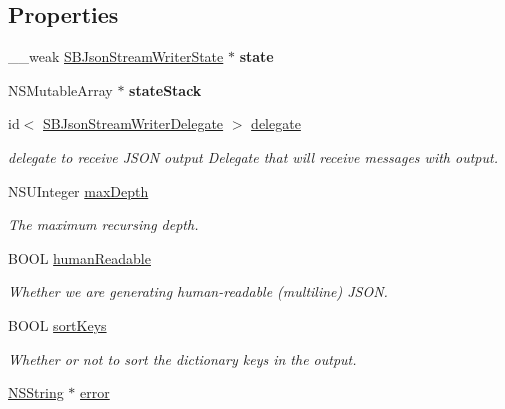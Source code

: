 \subsection*{\-Properties}
\begin{DoxyCompactItemize}
\item 
\hypertarget{interface_s_b_json_stream_writer_a39ceee8cac54429ab8851c1c7fab7360}{
\-\_\-\-\_\-weak \hyperlink{interface_s_b_json_stream_writer_state}{\-S\-B\-Json\-Stream\-Writer\-State} $\ast$ {\bfseries state}}
\label{interface_s_b_json_stream_writer_a39ceee8cac54429ab8851c1c7fab7360}

\item 
\hypertarget{interface_s_b_json_stream_writer_a8d85254a1e60703a2f8e3be4a6002495}{
\-N\-S\-Mutable\-Array $\ast$ {\bfseries state\-Stack}}
\label{interface_s_b_json_stream_writer_a8d85254a1e60703a2f8e3be4a6002495}

\item 
\hypertarget{interface_s_b_json_stream_writer_a7ab6ec363a52e32056130dbcefadd952}{
id$<$ \hyperlink{protocol_s_b_json_stream_writer_delegate-p}{\-S\-B\-Json\-Stream\-Writer\-Delegate} $>$ \hyperlink{interface_s_b_json_stream_writer_a7ab6ec363a52e32056130dbcefadd952}{delegate}}
\label{interface_s_b_json_stream_writer_a7ab6ec363a52e32056130dbcefadd952}

\begin{DoxyCompactList}\small\item\em delegate to receive \-J\-S\-O\-N output \-Delegate that will receive messages with output. \end{DoxyCompactList}\item 
\-N\-S\-U\-Integer \hyperlink{interface_s_b_json_stream_writer_a146e7e950ab74a0e766ffd860e454fc9}{max\-Depth}
\begin{DoxyCompactList}\small\item\em \-The maximum recursing depth. \end{DoxyCompactList}\item 
\-B\-O\-O\-L \hyperlink{interface_s_b_json_stream_writer_af43e8bd7170d6128480515f532b7b791}{human\-Readable}
\begin{DoxyCompactList}\small\item\em \-Whether we are generating human-\/readable (multiline) \-J\-S\-O\-N. \end{DoxyCompactList}\item 
\-B\-O\-O\-L \hyperlink{interface_s_b_json_stream_writer_ab206c6844a0fd20307b5dfe881e17bf2}{sort\-Keys}
\begin{DoxyCompactList}\small\item\em \-Whether or not to sort the dictionary keys in the output. \end{DoxyCompactList}\item 
\hypertarget{interface_s_b_json_stream_writer_af9ad1ac60aaa480f4b4543e42e40fcf2}{
\hyperlink{class_n_s_string}{\-N\-S\-String} $\ast$ \hyperlink{interface_s_b_json_stream_writer_af9ad1ac60aaa480f4b4543e42e40fcf2}{error}}
\label{interface_s_b_json_stream_writer_af9ad1ac60aaa480f4b4543e42e40fcf2}


\end{DoxyCompactItemize}
